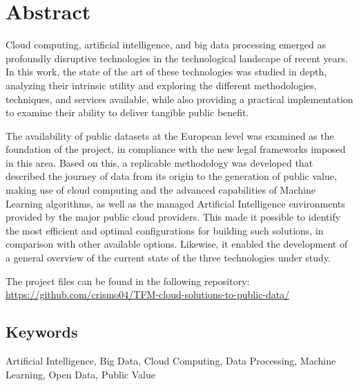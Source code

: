 \chapter*{Abstract}

Cloud computing, artificial intelligence, and big data processing emerged as profoundly disruptive technologies in the technological landscape of recent years. In this work, the state of the art of these technologies was studied in depth, analyzing their intrinsic utility and exploring the different methodologies, techniques, and services available, while also providing a practical implementation to examine their ability to deliver tangible public benefit.

The availability of public datasets at the European level was examined as the foundation of the project, in compliance with the new legal frameworks imposed in this area. Based on this, a replicable methodology was developed that described the journey of data from its origin to the generation of public value, making use of cloud computing and the advanced capabilities of Machine Learning algorithms, as well as the managed Artificial Intelligence environments provided by the major public cloud providers. This made it possible to identify the most efficient and optimal configurations for building such solutions, in comparison with other available options. Likewise, it enabled the development of a general overview of the current state of the three technologies under study.

The project files can be found in the following repository: \url{https://github.com/crismo04/TFM-cloud-solutions-to-public-data/}

\section*{Keywords}

\noindent Artificial Intelligence, Big Data, Cloud Computing, Data Processing, Machine Learning, Open Data, Public Value


